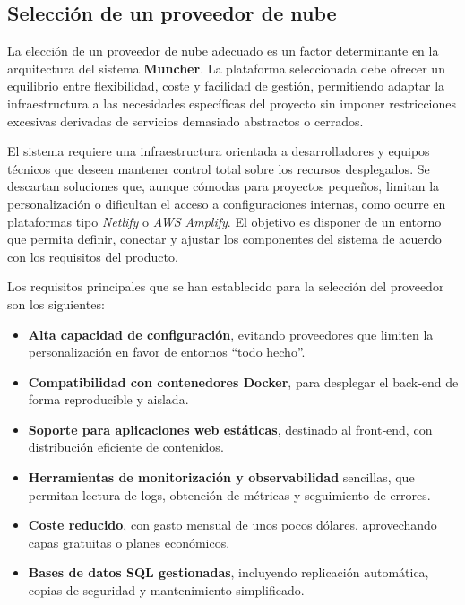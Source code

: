 \subsection*{Selección de un proveedor de nube}

La elección de un proveedor de nube adecuado es un factor determinante en la arquitectura del sistema \textbf{Muncher}. La plataforma seleccionada debe ofrecer un equilibrio entre flexibilidad, coste y facilidad de gestión, permitiendo adaptar la infraestructura a las necesidades específicas del proyecto sin imponer restricciones excesivas derivadas de servicios demasiado abstractos o cerrados.

El sistema requiere una infraestructura orientada a desarrolladores y equipos técnicos que deseen mantener control total sobre los recursos desplegados. Se descartan soluciones que, aunque cómodas para proyectos pequeños, limitan la personalización o dificultan el acceso a configuraciones internas, como ocurre en plataformas tipo \textit{Netlify} o \textit{AWS Amplify}. El objetivo es disponer de un entorno que permita definir, conectar y ajustar los componentes del sistema de acuerdo con los requisitos del producto.

Los requisitos principales que se han establecido para la selección del proveedor son los siguientes:

\begin{itemize}
	\item \textbf{Alta capacidad de configuración}, evitando proveedores que limiten la personalización en favor de entornos “todo hecho”.
	\item \textbf{Compatibilidad con contenedores Docker}, para desplegar el back‑end de forma reproducible y aislada.
	\item \textbf{Soporte para aplicaciones web estáticas}, destinado al front‑end, con distribución eficiente de contenidos.
	\item \textbf{Herramientas de monitorización y observabilidad} sencillas, que permitan lectura de logs, obtención de métricas y seguimiento de errores.
	\item \textbf{Coste reducido}, con gasto mensual de unos pocos dólares, aprovechando capas gratuitas o planes económicos.
	\item \textbf{Bases de datos SQL gestionadas}, incluyendo replicación automática, copias de seguridad y mantenimiento simplificado.
\end{itemize}


